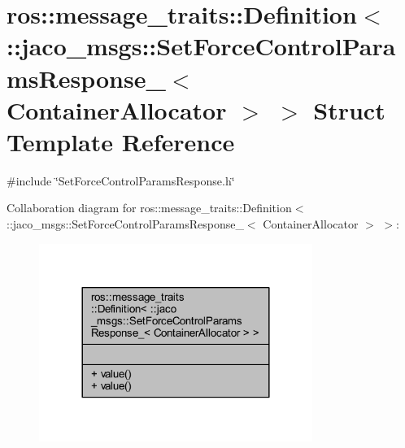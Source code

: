 \hypertarget{structros_1_1message__traits_1_1Definition_3_01_1_1jaco__msgs_1_1SetForceControlParamsResponse__095d983db8d83707a3d1e1cd70107388}{}\section{ros\+:\+:message\+\_\+traits\+:\+:Definition$<$ \+:\+:jaco\+\_\+msgs\+:\+:Set\+Force\+Control\+Params\+Response\+\_\+$<$ Container\+Allocator $>$ $>$ Struct Template Reference}
\label{structros_1_1message__traits_1_1Definition_3_01_1_1jaco__msgs_1_1SetForceControlParamsResponse__095d983db8d83707a3d1e1cd70107388}


{\ttfamily \#include \char`\"{}Set\+Force\+Control\+Params\+Response.\+h\char`\"{}}



Collaboration diagram for ros\+:\+:message\+\_\+traits\+:\+:Definition$<$ \+:\+:jaco\+\_\+msgs\+:\+:Set\+Force\+Control\+Params\+Response\+\_\+$<$ Container\+Allocator $>$ $>$\+:
\nopagebreak
\begin{figure}[H]
\begin{center}
\leavevmode
\includegraphics[width=252pt]{de/d2e/structros_1_1message__traits_1_1Definition_3_01_1_1jaco__msgs_1_1SetForceControlParamsResponse__0002d859bf269ea0ef3e2bd81e694322}
\end{center}
\end{figure}
